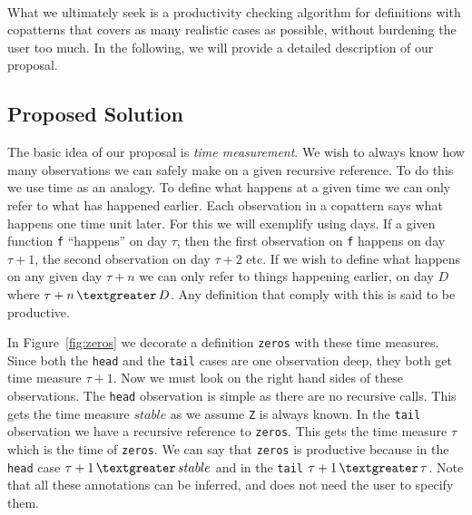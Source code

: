 \paragraph{}
What we ultimately seek is a productivity checking algorithm for definitions with copatterns that covers as many realistic cases as possible, without burdening the user too much. In the following, we will provide a detailed description of our proposal.
\subsection{Proposed Solution}
The basic idea of our proposal is \textit{time measurement}. We wish to always know how many observations we can safely make on a given recursive reference. To do this we use time as an analogy. To define what happens at a given time we can only refer to what has happened earlier. Each observation in a copattern says what happens one time unit later. For this we will exemplify using days. If a given function \texttt{f} ``happens'' on day $\tau$, then the first observation on \texttt{f} happens on day $\tau+1$, the second observation on day $\tau+2$ etc. If we wish to define what happens on any given day $\tau+n$ we can only refer to things happening earlier, on day $D$ where $\tau+n\, \textgreater \,D$. Any definition that comply with this is said to be productive.

In Figure~\ref{fig:zeros} we decorate a definition \texttt{zeros} with these time measures. Since both the \texttt{head} and the \texttt{tail} cases are one observation deep, they both get time measure $\tau+1$. Now we must look on the right hand sides of these observations. The \texttt{head} observation is simple as there are no recursive calls. This gets the time measure $stable$  as we assume \texttt{Z} is always known. In the \texttt{tail} observation we have a recursive reference to \texttt{zeros}. This gets the time measure $\tau$ which is the time of \texttt{zeros}. We can say that \texttt{zeros} is productive because in the \texttt{head} case $\tau+1\,\textgreater\,stable$ and in the \texttt{tail} $\tau+1\,\textgreater\,\tau$. Note that all these annotations can be inferred, and does not need the user to specify them.

